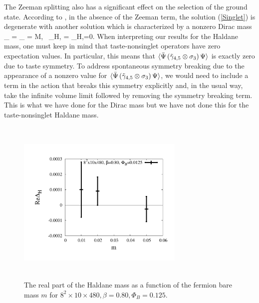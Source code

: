 \documentclass[aps,prd,twocolumn,showpacs,superscriptaddress,groupedaddress]{revtex4}  %
\begin{document}
The Zeeman splitting also has a significant effect on the selection of the ground state. According to \cite{MiranskyGraphene2,MiranskyGraphene3}, in the absence of the Zeeman term, the solution (\ref{Singlet}) is degenerate with another solution which is characterized by a nonzero Dirac mass
\beq
\label{Triplet}
\tilde{\Delta}_{\uparrow} = \tilde{\Delta}_{\downarrow} = M, ~\Delta_{H,\uparrow} = \Delta_{H,\downarrow}=0.
\eeq
When interpreting our results for the Haldane mass, one must keep in mind that taste-nonsinglet operators have zero expectation values. In particular, this means that ${\langle  {\bar \Psi} \left( \tilde{\gamma}_{4,5} \otimes \sigma_3 \right) \Psi \rangle}$ is exactly zero due to taste symmetry. To address spontaneous symmetry breaking due to the appearance of a nonzero value for ${\langle  {\bar \Psi} \left( \tilde{\gamma}_{4,5} \otimes \sigma_3 \right) \Psi \rangle}$, we would need to include a term in the action that breaks this symmetry explicitly and, in the usual way, take the infinite volume limit followed by removing the symmetry breaking term. This is what we have done for the Dirac mass but we have not done this for the taste-nonsinglet Haldane mass.

\begin{figure}
 \includegraphics[height=8cm,width=8cm]{haldane_real_vs_m_Nt480_PHIB0125.pdf} \hspace{-1cm}
\caption{The real part of the Haldane mass as a function of the fermion bare mass $m$ for $8^2\times10\times480,\beta=0.80, \Phi_B=0.125$.}
\label{ReHaldanevsm} 
\end{figure}
\end{document}
